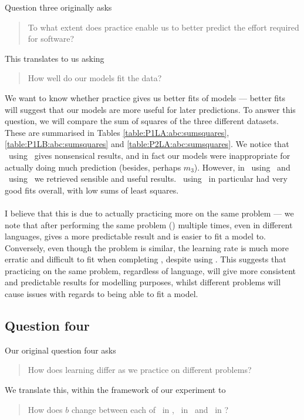 Question three originally asks
\begin{quote}
  To what extent does practice enable us to better predict the effort required
  for software?
\end{quote}

This translates to us asking
\begin{quote}
  How well do our models fit the data?
\end{quote}

We want to know whether practice gives us better fits of models --- better fits
will suggest that our models are more useful for later predictions.
To answer this question, we will compare the sum of squares of the three
different datasets.
These are summarised in Tables \ref{table:P1LA:abc:sumsquares},
\ref{table:P1LB:abc:sumsquares} and \ref{table:P2LA:abc:sumsquares}.
We notice that \PO\ using \LA\ gives nonsensical results, and in fact our models
were inappropriate for actually doing much prediction (besides, perhaps $m_3$).
However, in \PT\ using \LA\ and \PO\ using \LB\ we retrieved sensible and useful
results.
\PO\ using \LB\ in particular had very good fits overall, with low sums of least
squares.\\
\\
I believe that this is due to actually practicing more on the same problem ---
we note that after performing the same problem (\PO) multiple times, even in
different languages, gives a more predictable result and is easier to fit a
model to.
Conversely, even though the problem is similar, the learning rate is much more
erratic and difficult to fit when completing \PT, despite using \LA.
This suggests that practicing on the same problem, regardless of language, will give more
consistent and predictable results for modelling purposes, whilst different
problems will cause issues with regards to being able to fit a model.

\subsection{Question four}

Our original question four asks
\begin{quote}
  How does learning differ as we practice on different problems? 
\end{quote}

We translate this, within the framework of our experiment to
\begin{quote}
   How does $b$ change between each of \PO\ in \LA, \PO\ in
   \LB\ and \PT\ in \LA?
\end{quote}

